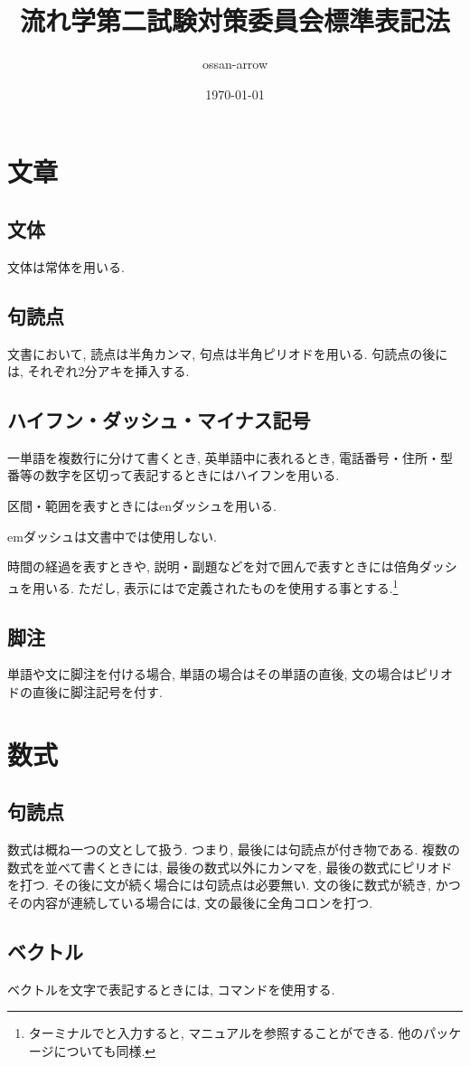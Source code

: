 \documentclass[uplatex,a4j,twocolumn]{jsarticle}
\begin{document}
\title{\「流れ学第二\」試験対策委員会標準表記法}
\author{ossan-arrow}
\date{\today}
\maketitle

\section{文章}
	\subsection{文体}
		文体は常体を用いる.
	\subsection{句読点}
		文書において, 読点は半角カンマ, 句点は半角ピリオドを用いる. 句読点の後には, それぞれ2分アキを挿入する.
	\subsection{ハイフン・ダッシュ・マイナス記号}
		一単語を複数行に分けて書くとき, 英単語中に表れるとき, 電話番号・住所・型番等の数字を区切って表記するときにはハイフンを用いる.
		
		区間・範囲を表すときにはenダッシュを用いる.
		
		emダッシュは文書中では使用しない.
		
		時間の経過を表すときや, 説明・副題などを対で囲んで表すときには倍角ダッシュを用いる. ただし, 表示にはで定義されたものを使用する事とする.\footnote{ターミナルで\『\』と入力すると, マニュアルを参照することができる. 他のパッケージについても同様.}
	\subsection{脚注}
		単語や文に脚注を付ける場合, 単語の場合はその単語の直後, 文の場合はピリオドの直後に脚注記号を付す.
\section{数式}
	\subsection{句読点}
		数式は概ね一つの文として扱う. つまり, 最後には句読点が付き物である. 複数の数式を並べて書くときには, 最後の数式以外にカンマを, 最後の数式にピリオドを打つ. その後に文が続く場合には句読点は必要無い. 文の後に数式が続き, かつその内容が連続している場合には, 文の最後に全角コロンを打つ.
	\subsection{ベクトル}
		ベクトルを文字で表記するときには, コマンドを使用する.

\balance
\end{document}
